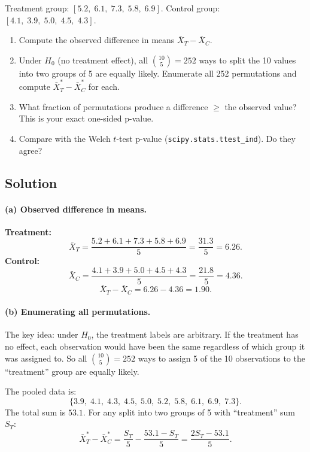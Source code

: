 \documentclass[11pt]{article}
\begin{document}
Treatment group: $[5.2,\; 6.1,\; 7.3,\; 5.8,\; 6.9]$. Control group: $[4.1,\; 3.9,\; 5.0,\; 4.5,\; 4.3]$.

\begin{enumerate}[label=\alph*)]
  \item Compute the observed difference in means $\bar{X}_T - \bar{X}_C$.
  \item Under $H_0$ (no treatment effect), all $\binom{10}{5} = 252$ ways to split the 10 values into two groups of 5 are equally likely. Enumerate all 252 permutations and compute $\bar{X}_T^* - \bar{X}_C^*$ for each.
  \item What fraction of permutations produce a difference $\geq$ the observed value? This is your exact one-sided p-value.
  \item Compare with the Welch $t$-test p-value (\texttt{scipy.stats.ttest\_ind}). Do they agree?
\end{enumerate}

\subsection*{Solution}

\paragraph{(a) Observed difference in means.}

\textbf{Treatment:}
\[
  \bar{X}_T = \frac{5.2 + 6.1 + 7.3 + 5.8 + 6.9}{5} = \frac{31.3}{5} = 6.26.
\]
\textbf{Control:}
\[
  \bar{X}_C = \frac{4.1 + 3.9 + 5.0 + 4.5 + 4.3}{5} = \frac{21.8}{5} = 4.36.
\]
\[
  \boxed{\bar{X}_T - \bar{X}_C = 6.26 - 4.36 = 1.90}.
\]

\paragraph{(b) Enumerating all permutations.}

The key idea: under $H_0$, the treatment labels are arbitrary. If the treatment has no effect, each observation would have been the same regardless of which group it was assigned to. So all $\binom{10}{5} = 252$ ways to assign 5 of the 10 observations to the ``treatment'' group are equally likely.

The pooled data is:
\[
  \{3.9,\; 4.1,\; 4.3,\; 4.5,\; 5.0,\; 5.2,\; 5.8,\; 6.1,\; 6.9,\; 7.3\}.
\]
The total sum is $53.1$. For any split into two groups of 5 with ``treatment'' sum $S_T$:
\[
  \bar{X}_T^* - \bar{X}_C^* = \frac{S_T}{5} - \frac{53.1 - S_T}{5} = \frac{2S_T - 53.1}{5}.
\]
\end{document}
